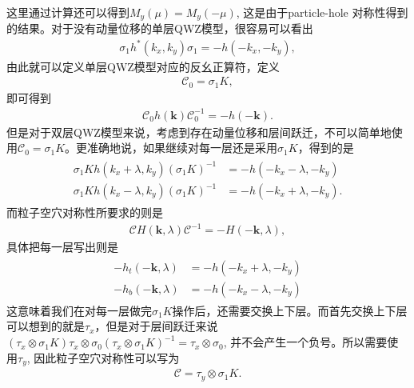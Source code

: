 \documentclass[10pt, oneside]{article}
\begin{document}
这里通过计算还可以得到\(M_{y}\left(\mu\right) = M_{y} \left(- \mu\right)\), 这是由于particle-hole 对称性得到的结果。对于没有动量位移的单层QWZ模型，很容易可以看出
\begin{align}
	\sigma_{1} h^{*} \left(k_{x}, k_{y}\right) \sigma_{1} = - h\left(-k_{x}, -k_{y}\right),
\end{align}
由此就可以定义单层QWZ模型对应的反幺正算符，定义
\begin{align}
	\mathcal{C}_{0} = \sigma_{1} K,
\end{align}
即可得到
\begin{align}
	\mathcal{C}_{0} h \left(\bm{k}\right) \mathcal{C}_{0}^{-1} = -h \left(- \bm{k}\right).
\end{align}
但是对于双层QWZ模型来说，考虑到存在动量位移和层间跃迁，不可以简单地使用\(\mathcal{C}_{0} = \sigma_{1} K\)。更准确地说，如果继续对每一层还是采用\(\sigma_{1}K\)，得到的是
\begin{align}
	\begin{split}
		\sigma_{1} K h\left(k_{x} + \lambda , k_{y}\right) \left(\sigma_{1} K \right)^{-1} &= - h \left(- k_{x} -\lambda, -k_{y}\right) \\
		\sigma_{1} K h\left(k_{x} - \lambda , k_{y}\right) \left(\sigma_{1} K \right)^{-1} &= - h \left(- k_{x} + \lambda, -k_{y}\right).
	\end{split}
\end{align}
而粒子空穴对称性所要求的则是
\begin{align}
	\mathcal{C} H \left(\bm{k}, \lambda\right) \mathcal{C }^{-1} = - H \left(-\bm{k }, \lambda\right),
\end{align}
具体把每一层写出则是
\begin{align}
	\begin{split}
		- h_{t } \left( -\bm{k }, \lambda\right) &= - h \left( -k_{x} + \lambda, -k_{y}\right) \\
		- h_{b} \left( -\bm{k }, \lambda\right) &= - h \left( -k_{x} - \lambda, -k_{y}\right)
	\end{split}
\end{align}
这意味着我们在对每一层做完\(\sigma_{1} K\)操作后，还需要交换上下层。而首先交换上下层可以想到的就是\(\tau_{x}\)，但是对于层间跃迁来说\(\left(\tau_{x } \otimes \sigma_{1} K\right) \tau_{x } \otimes \sigma_{0} \left(\tau_{x } \otimes \sigma_{1} K \right)^{-1} = \tau_{x } \otimes \sigma_{0}\), 并不会产生一个负号。所以需要使用\(\tau_{y }\), 因此粒子空穴对称性可以写为
\begin{align}
	\mathcal{C} = \tau_{y } \otimes \sigma_{1} K.
\end{align}
\end{document}
